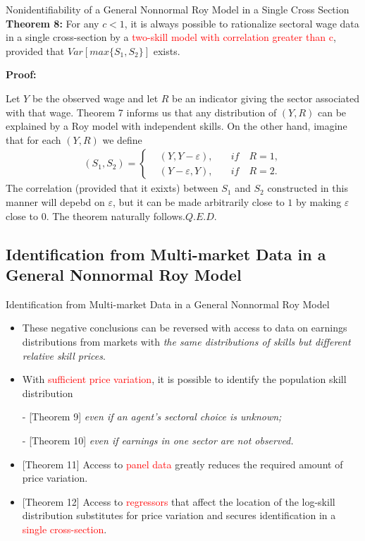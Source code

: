 \documentclass{beamer}
\begin{document}
\begin{frame}{Nonidentifiability of a General Nonnormal Roy Model in a Single Cross Section}
\textbf{Theorem 8:} For any $c<1$, it is always possible to rationalize sectoral wage data in a single cross-section by a \textcolor{red}{two-skill model with correlation greater than c}, provided that $Var[max\{S_1,S_2\}]$ exists.

\bigskip
\textbf{Proof:}

Let $Y$ be the observed wage and let $R$ be an indicator giving the sector associated with that wage. Theorem 7 informs us that any distribution of $(Y,R)$ can be explained by a Roy model with independent skills. On the other hand, imagine that for each $(Y,R)$ we define
	\begin{align}\nonumber
	(S_1,S_2)=\left\{
	\begin{aligned}
	&(Y,Y-\varepsilon),\quad &if\quad R=1,\\
	&(Y-\varepsilon,Y),\quad &if\quad R=2.
	\end{aligned}\right.
	\end{align}
The correlation (provided that it exixts) between $S_1$ and $S_2$ constructed in this manner will depebd on $\varepsilon$, but it can be made arbitrarily close to $1$ by making $\varepsilon$ close to $0$. The theorem naturally follows.\hfill $Q.E.D.$


\end{frame}

\subsection{Identification from Multi-market Data in a General Nonnormal Roy Model}
\begin{frame}{Identification from Multi-market Data in a General Nonnormal Roy Model}
	\begin{itemize}
		\item These negative conclusions can be reversed with access to data on earnings distributions from markets with \textit{the same distributions of skills but different relative skill prices}.
		\bigskip
		\item With \textcolor{red}{sufficient price variation}, it is possible to identify the population skill distribution
		\item [-] {[Theorem 9]} \textit{even if an agent's sectoral choice is unknown;}
		\item [-] {[Theorem 10]} \textit{even if earnings in one sector are not observed.}
		\item {[Theorem 11]} Access to \textcolor{red}{panel data} greatly reduces the required amount of price variation.
		\item {[Theorem 12]} Access to \textcolor{red}{regressors} that affect the location of the log-skill distribution substitutes for price variation and secures identification in a \textcolor{red}{single cross-section}.
	\end{itemize}
\end{frame}
\end{document}
